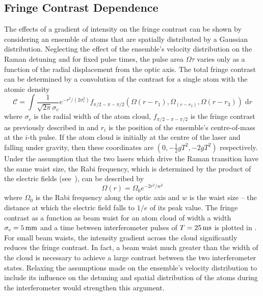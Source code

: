 \subsection{Fringe Contrast Dependence}\label{subsec:fringe_contrast}

The effects of a gradient of intensity on the fringe contrast can be shown by considering an ensemble of atoms that are spatially distributed by a Gaussian distribution. Neglecting the effect of the ensemble's velocity distribution on the Raman detuning and for fixed pulse times, the pulse area \(\Omega \tau\) varies only as a function of the radial displacement from the optic axis. The total fringe contrast can be determined by a convolution of the contrast for a single atom with the atomic density
\begin{equation}
    \mathcal{C} = \int \frac{1}{\sqrt{2\pi}\sigma_c}e^{-r^2/(2\sigma_c^2)} f_{\pi/2-\pi-\pi/2}\left(\Omega(r-r_1),\Omega_(r-r_2),\Omega(r-r_3)\right) \;\mathrm{d}r
    \label{eq:cloud_contrast}
\end{equation}
where \(\sigma_c\) is the radial width of the atom cloud, \(f_{\pi/2-\pi-\pi/2}\) is the fringe contrast as previously described in  and \(r_i\) is the position of the ensemble's centre-of-mass at the \(i\)-th pulse. If the atom cloud is initially at the centre of the laser and falling under gravity, then these coordinates are \(\left(0, -\frac{1}{2}g T^2, -2 g T^2\right)\) respectively. Under the assumption that the two lasers which drive the Raman transition have the same waist size, the Rabi frequency, which is determined by the product of the electric fields (see~), can be described by 
\begin{equation}
    \Omega(r) = \Omega_0 e^{-2 r^2/w^2}
\end{equation}
where \(\Omega_0\) is the Rabi frequency along the optic axis and \(w\) is the waist size -- the distance at which the electric field falls to \(1/e\) of its peak value. The fringe contrast as a function as beam waist for an atom cloud of width a width \(\sigma_c = \sivalue{5}{\milli\metre}\) and a time between interferometer pulses of \(T = \sivalue{25}{\milli\second}\) is plotted in . For small beam waists, the intensity gradient across the cloud significantly reduces the fringe contrast. In fact, a beam waist much greater than the width of the cloud is necessary to achieve a large contrast between the two interferometer states. Relaxing the assumptions made on the ensemble's velocity distribution to include its influence on the detuning and spatial distribution of the atoms during the interferometer would strengthen this argument.
